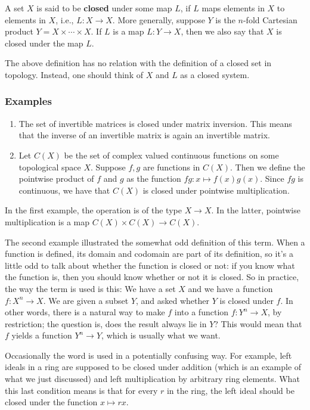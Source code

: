 \documentclass[12pt]{article}
\begin{document}
A set $X$ is said to be {\bf closed} under some map 
$L$, if $L$ maps elements in $X$ to elements in $X$, i.e., $L:X\to X$. 
More generally, suppose $Y$ is the $n$-fold Cartesian product
$Y=X\times \cdots \times X$. If $L$ is a map $L:Y\to X$, then we
also say that $X$ is closed under the map $L$. 

The above definition has no relation with the definition of a
closed set in topology. Instead, 
one should  think of $X$ and $L$ as a closed 
system. 

\subsubsection*{Examples}
\begin{enumerate}
\item The set of invertible matrices is closed under matrix inversion. 
This means that the inverse of an invertible matrix is again an
invertible matrix.
\item Let $C(X)$ be the set of complex valued continuous functions on 
some topological space $X$. 
Suppose $f,g$ are functions in $C(X)$. Then we define the
pointwise product of $f$ and $g$ as the function $fg: x\mapsto f(x) g(x)$. 
Since $fg$ is continuous, we have that 
$C(X)$ is closed under pointwise multiplication. 
\end{enumerate}

In the first example, the operation is of the type $X\to X$. In the latter, 
pointwise multiplication is a map $C(X)\times C(X)\to C(X)$.

The second example illustrated the somewhat odd definition of this term. When a function is defined, its domain and codomain are part of its definition, so it's a little odd to talk about whether the function is closed or not: if you know what the function is, then you should know whether or not it is closed.  So in practice, the way the term is used is this: We have a set $X$ and we have a function $f\colon X^n\to X$. We are given a subset $Y$, and asked whether $Y$ is closed under $f$. In other words, there is a natural way to make $f$ into a function $f\colon Y^n\to X$, by restriction; the question is, does the result always lie in $Y$?  This would mean that $f$ yields a function $Y^n\to Y$, which is usually what we want.

Occasionally the word is used in a potentially confusing way.  For example, left ideals in a ring are supposed to be closed under addition (which is an example of what we just discussed) and left multiplication by arbitrary ring elements.  What this last condition means is that for every $r$ in the ring, the left ideal should be closed under the function $x\mapsto rx$.
\end{document}
